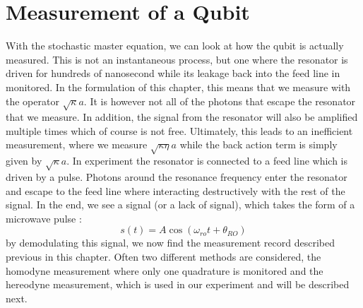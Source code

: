 \section{Measurement of a Qubit}
With the stochastic master equation, we can look at how the qubit is actually measured. This is not an instantaneous process, but one where the resonator is driven for hundreds of nanosecond while its leakage back into the feed line in monitored. In the formulation of this chapter, this means that we measure with the operator $\sqrt{\kappa} a$. It is however not all of the photons that escape the resonator that we measure. In addition, the signal from the resonator will also be amplified multiple times which of course is not free. Ultimately, this leads to an inefficient measurement, where we measure $\sqrt{\kappa\eta} a$ while the back action term is simply given by $\sqrt{\kappa}a$.
In experiment the resonator is connected to a feed line which is driven by a pulse. Photons around the resonance frequency enter the resonator and escape to the feed line where interacting destructively with the rest of the signal. In the end, we see a signal (or a lack of signal), which takes the form of a microwave pulse \cite{krantz_quantum_2019}:
\begin{equation}
    s(t) = A \cos(\omega_{ro}t + \theta_{RO}) 
\end{equation}
by demodulating this signal, we now find the measurement record described previous in this chapter. Often two different methods are considered, the homodyne measurement where only one quadrature is monitored and the hereodyne measurement, which is used in our experiment and will be described next.

